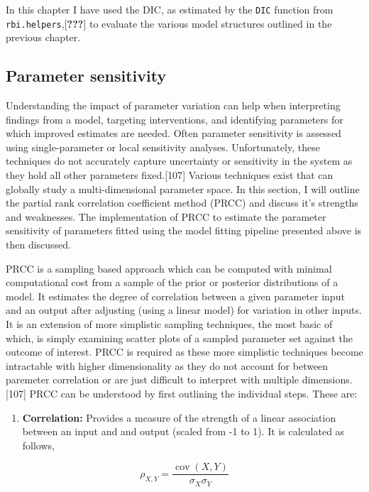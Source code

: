 \documentclass[11pt,twoside]{bristolthesis}
\providecommand{\tightlist}{%
  \setlength{\itemsep}{0pt}\setlength{\parskip}{0pt}}
\begin{document}
  In this chapter I have used the DIC, as estimated by the \texttt{DIC} function from \texttt{rbi.helpers},{[}{\textbf{???}}{]} to evaluate the various model structures outlined in the previous chapter.
  
  \hypertarget{parameter-sensitivity}{%
  \subsection{Parameter sensitivity}\label{parameter-sensitivity}}
  
  Understanding the impact of parameter variation can help when interpreting findings from a model, targeting interventions, and identifying parameters for which improved estimates are needed. Often parameter sensitivity is assessed using single-parameter or local sensitivity analyses. Unfortunately, these techniques do not accurately capture uncertainty or sensitivity in the system as they hold all other parameters fixed.{[}107{]} Various techniques exist that can globally study a multi-dimensional parameter space. In this section, I will outline the partial rank correlation coefficient method (PRCC) and discuss it's strengths and weaknesses. The implementation of PRCC to estimate the parameter sensitivity of parameters fitted using the model fitting pipeline presented above is then discussed.
  
  PRCC is a sampling based approach which can be computed with minimal computational cost from a sample of the prior or posterior distributions of a model. It estimates the degree of correlation between a given parameter input and an output after adjusting (using a linear model) for variation in other inputs. It is an extension of more simplistic sampling techniques, the most basic of which, is simply examining scatter plots of a sampled parameter set against the outcome of interest. PRCC is required as these more simplistic techniques become intractable with higher dimensionality as they do not account for between paremeter correlation or are just difficult to interpret with multiple dimensions.{[}107{]} PRCC can be understood by first outlining the individual steps. These are:
  \begin{enumerate}
  \def\labelenumi{\arabic{enumi}.}
  \tightlist
  \item
    \textbf{Correlation:} Provides a measure of the strength of a linear association between an input and and output (scaled from -1 to 1). It is calculated as follows,
  \end{enumerate}
  \[ 
  {\displaystyle \rho _{X,Y}={\frac {\operatorname {cov} (X,Y)}{\sigma _{X}\sigma _{Y}}}}
  \]
  
\end{document}
